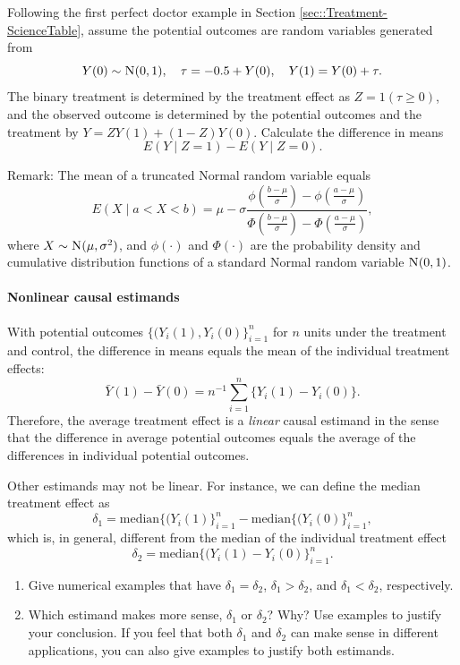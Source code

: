 Following the first perfect doctor example in Section \ref{sec::Treatment-ScienceTable}, assume the potential outcomes are random variables generated from 
$$
Y(0) \sim \textsc{N}(0,1), \quad \tau = -0.5 + Y(0),\quad Y(1)  = Y(0) + \tau .
$$
The binary treatment is determined by the treatment effect as $Z = 1(\tau \geq 0)$, and the observed outcome is determined by the potential outcomes and the treatment by $Y = ZY(1) + (1-Z) Y(0)$. Calculate the difference in means
$$
E(Y\mid Z=1) - E(Y\mid Z=0).
$$


Remark: The mean of a truncated Normal random variable equals 
$$
E(X\mid   a < X < b ) = \mu - \sigma \frac{   \phi \left(  \frac{b-\mu}{\sigma} \right )   -  \phi \left(  \frac{a-\mu}{\sigma} \right )   }
{   \Phi \left(  \frac{b-\mu}{\sigma} \right )   -  \Phi \left(  \frac{a-\mu}{\sigma} \right )   } , 
$$
where $X \sim \textsc{N}(\mu, \sigma^2)$, and $\phi(\cdot)$ and $\Phi(\cdot)$ are the probability density and cumulative distribution functions of a standard Normal random variable $\textsc{N}(0,1)$. 



\paragraph{Nonlinear causal estimands}
\label{hw::nonlinear-causal-estimands}



With potential outcomes $\{  (Y_i(1), Y_i(0) \}_{i=1}^n$ for $n$ units under the treatment and control, the difference in means equals the mean of the individual treatment effects:
$$
\bar{Y}(1) - \bar{Y}(0) = n^{-1} \sum_{i=1}^n  \{ Y_i(1) - Y_i(0) \}.
$$
Therefore, the average treatment effect is a {\it linear} causal estimand in the sense that the difference in average potential outcomes equals the average of the differences in individual potential outcomes. 


Other estimands may not be linear. For instance, we can define the median treatment effect as
$$
\delta_1 = \text{median}\{  (Y_i(1) \}_{i=1}^n - \text{median}\{  (Y_i(0) \}_{i=1}^n,
$$
which is, in general, different from the median of the individual treatment effect
$$
\delta_2 = \text{median}\{  (Y_i(1) - Y_i(0) \}_{i=1}^n .
$$

\begin{enumerate}
\item
Give numerical examples that have $\delta_1 = \delta_2$, $\delta_1 > \delta_2$, and $\delta_1 < \delta_2$, respectively. 


\item
Which estimand makes more sense, $\delta_1$ or $\delta_2$? Why? Use examples to justify your conclusion. If you feel that both $\delta_1$ and $\delta_2$ can make sense in different applications, you can also give examples to justify both estimands. 
\end{enumerate}




